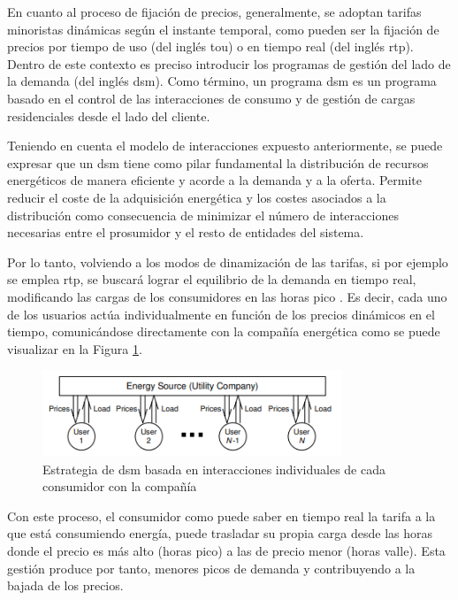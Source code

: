 \vspace{1mm}

En cuanto al proceso de fijación de precios, generalmente, se adoptan tarifas minoristas dinámicas según el instante temporal, como pueden ser la fijación de precios por tiempo de uso (del inglés \gls{tou}) o en tiempo real (del inglés \gls{rtp}). Dentro de este contexto es preciso introducir los programas de gestión del lado de la demanda (del inglés \gls{dsm}). Como término, un programa \gls{dsm} es un programa basado en el control de las interacciones de consumo y de gestión de cargas residenciales desde el lado del cliente. 

\vspace{3mm}

Teniendo en cuenta el modelo de interacciones expuesto anteriormente, se puede expresar que un \gls{dsm} tiene como pilar fundamental la distribución de recursos energéticos de manera eficiente y acorde a la demanda y a la oferta. Permite reducir el coste de la adquisición energética y los costes asociados a la distribución como consecuencia de minimizar el número de interacciones necesarias entre el prosumidor y el resto de entidades del sistema. \cite{dsm}

\vspace{3mm}

Por lo tanto, volviendo a los modos de dinamización de las tarifas, si por ejemplo se emplea \gls{rtp}, se buscará lograr el equilibrio de la demanda en tiempo real, modificando las cargas de los consumidores en las horas pico \cite{rtp}. Es decir, cada uno de los usuarios actúa individualmente en función de los precios dinámicos en el tiempo, comunicándose directamente con la compañía energética como se puede visualizar en la Figura \ref{fig:dsm1}. 

\begin{figure}[h!]
  \centering
  \includegraphics[width=0.8\textwidth]{img/teoria/dsm1.png}
  \caption{Estrategia de \gls{dsm} basada en interacciones individuales de cada consumidor con la compañía \cite{pricing}}
  \label{fig:dsm1}
\end{figure}

Con este proceso, el consumidor como puede saber en tiempo real la tarifa a la que está consumiendo energía, puede trasladar su propia carga desde las horas donde el precio es más alto (horas pico) a las de precio menor (horas valle). Esta gestión produce por tanto, menores picos de demanda y contribuyendo a la bajada de los precios. \cite{dsm} \cite{pricing}

